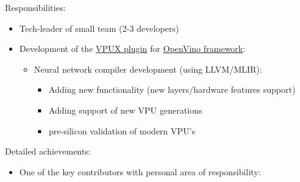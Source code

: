 \documentclass[a4paper,11pt]{memoir}
\newif\ifdetailed
\begin{document}
{
\ifdetailed
Contact info:
\begin{itemize}
	\item Address: Ireland, Leixlip, Co. Kildare, Collinstown Industrial Park
	\item Phone/e-mail: (+353 1) 606 2996 / HR.Support.and.Services@intel.com
\end{itemize}
\fi
Responsibilities:
\begin{itemize}
	\item Tech-leader of small team (2-3 developers)
	\ifdetailed
		\begin{itemize}
		\item Analyze voluminous tasks, make decomposition and an execution plan
		\item Prioritize tasks and provide time estimations
		\item Form and delegate clear tasks to teammates
		\item Review PR's and provide feadback
	\end{itemize}
	\fi
      \item Development of the \href{https://github.com/openvinotoolkit/vpux-plugin}{VPUX plugin} for \href{https://github.com/openvinotoolkit/openvino}{OpenVino framework}:
	\begin{itemize}
		\item Neural network compiler development (using LLVM/MLIR):
		\begin{itemize}
			\item Adding new functionality (new layers/hardware features support)
			\item Adding support of new VPU generations
			\item pre-silicon validation of modern VPU's
		\end{itemize}
		\ifdetailed
			\item VPU Runtime development:
			\begin{itemize}
				\item Adding new kernels/layers support
			\end{itemize}
		\fi
	\end{itemize}	
\end{itemize}
\ifdetailed
Detailed achievements:
\begin{itemize}
	\item One of the key contributors with personal area of responsibility:
	\begin{itemize} 

\end{itemize}
\end{itemize}}
\end{document}
